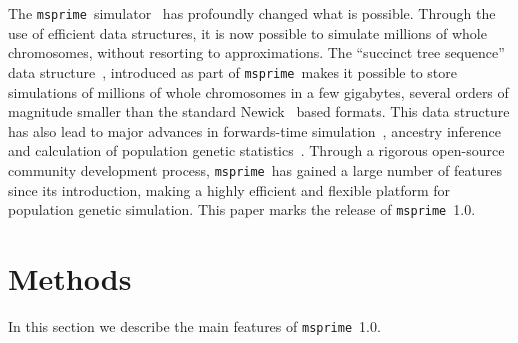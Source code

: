 \documentclass{article}
\newcommand{\msprime}[0]{\texttt{msprime}}
\begin{document}
The \msprime\ simulator~\citep{kelleher2016efficient,kelleher2020coalescent}
has profoundly changed
what is possible. Through the use of efficient data structures, it is
now possible to simulate millions of whole chromosomes, without resorting
to approximations. The ``succinct tree
sequence'' data
structure~\citep{kelleher2016efficient,kelleher2018efficient,kelleher2019inferring,
wohns2021unified},
introduced as part of \msprime\, makes it possible to store simulations
of millions of whole chromosomes in a few gigabytes, several orders
of magnitude smaller than the standard
Newick~\citep{felsenstein1989phylip} based formats. This data structure has
also lead to major advances in forwards-time
simulation~\citep{kelleher2018efficient,haller2018tree},
ancestry inference~\citep{kelleher2019inferring,wohns2021unified}
and calculation of population genetic statistics~\citep{ralph2019efficiently}.
Through a rigorous open-source community development process,
\msprime\ has gained a large number of features since its introduction,
making a highly efficient and flexible platform for population
genetic simulation.
This paper marks the release of \msprime\ 1.0.

%



\section*{Methods}

In this section we describe the main features of \msprime\ 1.0.
\end{document}
